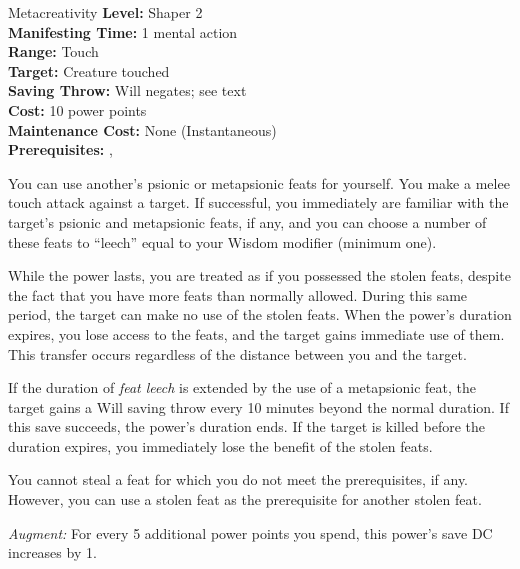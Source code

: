 {Metacreativity}
{
	\textbf{Level:}
	Shaper 2\\
	\textbf{Manifesting Time:}
	1 mental action\\
	\textbf{Range:}
	Touch\\
	\textbf{Target:}
	Creature touched\\
	\textbf{Saving Throw:}
	Will negates; see text\\
	\textbf{Cost:}
	10 power points\\
	\textbf{Maintenance Cost:}
	None (Instantaneous)\\
	\textbf{Prerequisites:}
	, \\
}
{
	You can use another's psionic or metapsionic feats for yourself. You make a melee touch attack against a target. If successful, you immediately are familiar with the target's psionic and metapsionic feats, if any, and you can choose a number of these feats to ``leech'' equal to your Wisdom modifier (minimum one).

	While the power lasts, you are treated as if you possessed the stolen feats, despite the fact that you have more feats than normally allowed. During this same period, the target can make no use of the stolen feats. When the power's duration expires, you lose access to the feats, and the target gains immediate use of them. This transfer occurs regardless of the distance between you and the target.

	If the duration of \emph{feat leech} is extended by the use of a metapsionic feat, the target gains a Will saving throw every 10 minutes beyond the normal duration. If this save succeeds, the power's duration ends. If the target is killed before the duration expires, you immediately lose the benefit of the stolen feats.

	You cannot steal a feat for which you do not meet the prerequisites, if any. However, you can use a stolen feat as the prerequisite for another stolen feat.

	\textit{Augment:} For every 5 additional power points you spend, this power's save DC increases by 1.
}